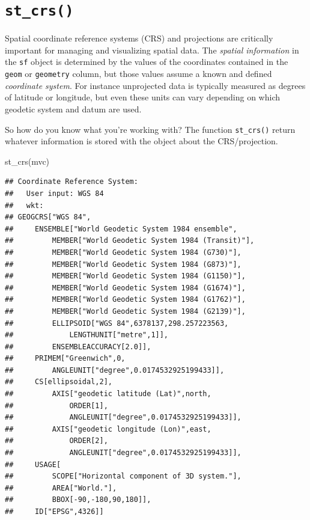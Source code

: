 \documentclass[
]{book}
\newenvironment{Shaded}{\begin{snugshade}}{\end{snugshade}}
\newcommand{\FunctionTok}[1]{\textcolor[rgb]{0.00,0.00,0.00}{#1}}
\newcommand{\NormalTok}[1]{#1}
\begin{document}
\hypertarget{st_crs}{%
\section{\texorpdfstring{\texttt{st\_crs()}}{st\_crs()}}\label{st_crs}}

Spatial coordinate reference systems (CRS) and projections are critically important for managing and visualizing spatial data. The \emph{spatial information} in the \texttt{sf} object is determined by the values of the coordinates contained in the \texttt{geom} or \texttt{geometry} column, but those values assume a known and defined \emph{coordinate system}. For instance unprojected data is typically measured as degrees of latitude or longitude, but even these units can vary depending on which geodetic system and datum are used.

So how do you know what you're working with? The function \texttt{st\_crs()} return whatever information is stored with the object about the CRS/projection.

\begin{Shaded}
\begin{Highlighting}[]
\FunctionTok{st\_crs}\NormalTok{(mvc)}
\end{Highlighting}
\end{Shaded}

\begin{verbatim}
## Coordinate Reference System:
##   User input: WGS 84 
##   wkt:
## GEOGCRS["WGS 84",
##     ENSEMBLE["World Geodetic System 1984 ensemble",
##         MEMBER["World Geodetic System 1984 (Transit)"],
##         MEMBER["World Geodetic System 1984 (G730)"],
##         MEMBER["World Geodetic System 1984 (G873)"],
##         MEMBER["World Geodetic System 1984 (G1150)"],
##         MEMBER["World Geodetic System 1984 (G1674)"],
##         MEMBER["World Geodetic System 1984 (G1762)"],
##         MEMBER["World Geodetic System 1984 (G2139)"],
##         ELLIPSOID["WGS 84",6378137,298.257223563,
##             LENGTHUNIT["metre",1]],
##         ENSEMBLEACCURACY[2.0]],
##     PRIMEM["Greenwich",0,
##         ANGLEUNIT["degree",0.0174532925199433]],
##     CS[ellipsoidal,2],
##         AXIS["geodetic latitude (Lat)",north,
##             ORDER[1],
##             ANGLEUNIT["degree",0.0174532925199433]],
##         AXIS["geodetic longitude (Lon)",east,
##             ORDER[2],
##             ANGLEUNIT["degree",0.0174532925199433]],
##     USAGE[
##         SCOPE["Horizontal component of 3D system."],
##         AREA["World."],
##         BBOX[-90,-180,90,180]],
##     ID["EPSG",4326]]
\end{verbatim}
\end{document}
